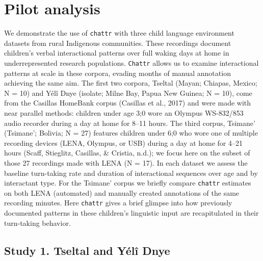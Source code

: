 \documentclass[10pt, letterpaper]{article}
\begin{document}
\hypertarget{pilot-analysis}{%
\section{Pilot analysis}\label{pilot-analysis}}

We demonstrate the use of \texttt{chattr} with three child language
environment datasets from rural Indigenous communities. These recordings
document children's verbal interactional patterns over full waking days
at home in underrepresented research populations. \texttt{Chattr} allows
us to examine interactional patterns at scale in these corpora, evading
months of manual annotation achieving the same aim. The first two
corpora, Tseltal (Mayan; Chiapas, Mexico; N = 10) and Yélî Dnye
(isolate; Milne Bay, Papua New Guinea; N = 10), come from the Casillas
HomeBank corpus (Casillas et al., 2017) and were made with near parallel
methods: children under age 3;0 wore an Olympus WS-832/853 audio
recorder during a day at home for 8--11 hours. The third corpus,
Tsimane' (Tsimane'; Bolivia; N = 27) features children under 6;0 who
wore one of multiple recording devices (LENA, Olympus, or USB) during a
day at home for 4--21 hours (Scaff, Stieglitz, Casillas, \& Cristia,
n.d.); we focus here on the subset of those 27 recordings made with LENA
(N = 17). In each dataset we assess the baseline turn-taking rate and
duration of interactional sequences over age and by interactant type.
For the Tsimane' corpus we briefly compare \texttt{chattr} estimates on
both LENA (automated) and manually created annotations of the same
recording minutes. Here \texttt{chattr} gives a brief glimpse into how
previously documented patterns in these children's linguistic input are
recapitulated in their turn-taking behavior.

\hypertarget{study-1.-tseltal-and-yuxe9luxee-dnye}{%
\subsection{Study 1. Tseltal and Yélî
Dnye}\label{study-1.-tseltal-and-yuxe9luxee-dnye}}
\end{document}
